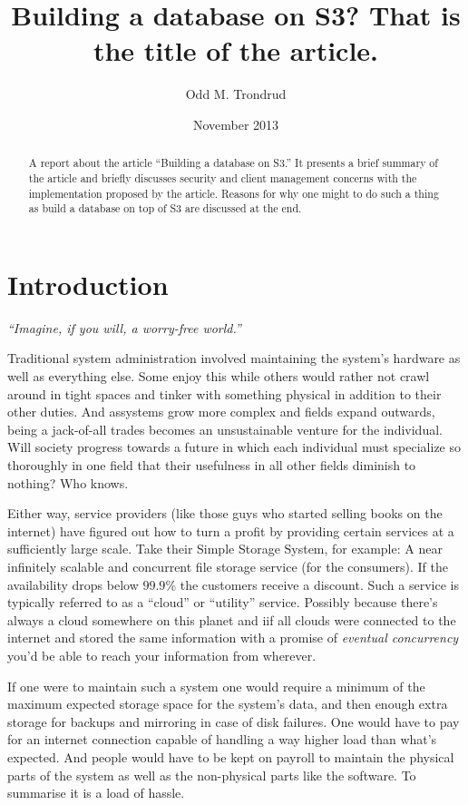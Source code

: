 \documentclass[11pt]{article}
\title{Building a database on S3? That is the title of the article.}
\author{Odd M. Trondrud}
\date{November 2013} %
\begin{document}
\maketitle

\begin{abstract}
A report about the article ``Building a database on S3.''
It presents a brief summary of the article and briefly discusses security and client management concerns with the implementation proposed by the article.
Reasons for why one might to do such a thing as build a database on top of S3 are discussed at the end.
\end{abstract}


\section{Introduction}
\textit{``Imagine, if you will, a worry-free world.''}

Traditional system administration involved maintaining the system's hardware as well as everything else.
Some enjoy this while others would rather not crawl around in tight spaces and tinker with something physical in addition to their other duties.
And assystems grow more complex and fields expand outwards, being a jack-of-all trades becomes an unsustainable venture for the individual.
Will society progress towards a future in which each individual must specialize so thoroughly in one field that their usefulness in all other fields diminish to nothing?
Who knows.

Either way, service providers (like those guys who started selling books on the internet) have figured out how to turn a profit by providing certain services at a sufficiently large scale.
Take their Simple Storage System, for example:
A near infinitely scalable and concurrent file storage service (for the consumers).
If the availability drops below $99.9\%$ the customers receive a discount.
Such a service is typically referred to as a ``cloud'' or ``utility'' service.
Possibly because there's always a cloud somewhere on this planet and iif all clouds were connected to the internet and stored the same information with a promise of \textit{eventual concurrency} you'd be able to reach your information from wherever.

If one were to maintain such a system one would require a minimum of the maximum expected storage space for the system's data, and then enough extra storage for backups and mirroring in case of disk failures.
One would have to pay for an internet connection capable of handling a way higher load than what's expected.
And people would have to be kept on payroll to maintain the physical parts of the system as well as the non-physical parts like the software.
To summarise it is a load of hassle.
\end{document}
